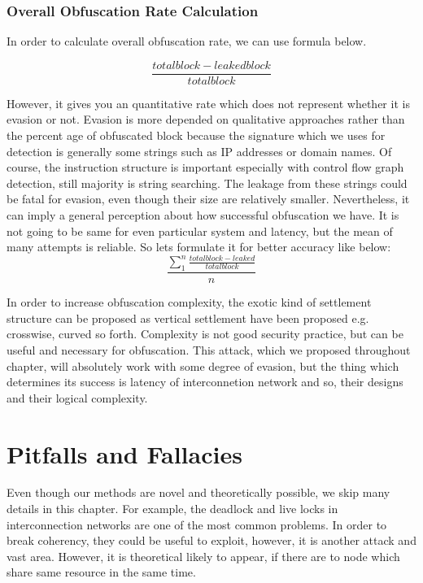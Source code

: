 \subsubsection{Overall Obfuscation Rate Calculation}
In order to calculate overall obfuscation rate, we can use formula below. 

\begin{equation}
	\frac{totalblock-leakedblock}{totalblock}
\end{equation}

However, it gives you an quantitative rate which does not represent whether it is evasion or not. Evasion is more depended on qualitative approaches rather than the percent age of obfuscated block because the signature which we uses for detection is generally some strings such as IP addresses or domain names. Of course, the instruction structure is important especially with control flow graph detection, still majority is string searching. The leakage from these strings could be fatal for evasion, even though their size are relatively smaller. Nevertheless, it can imply a general perception about how successful obfuscation we have. It is not going to be same for even particular system and latency, but the mean of many attempts is reliable. So lets formulate it for better accuracy like below:
\begin{equation}
	\frac{\sum_{1}^{n}\frac{totalblock-leaked}{totalblock}}{n}
\end{equation}

In order to increase obfuscation complexity, the exotic kind of settlement structure can be proposed as vertical settlement have been proposed e.g. crosswise, curved so forth. Complexity is not good security practice, but can be useful and necessary for obfuscation. This attack, which we proposed  throughout chapter, will absolutely work with some degree of evasion, but the thing which determines its success is latency of interconnetion network and so, their designs and their logical complexity.
\section{Pitfalls and Fallacies}
Even though our methods are novel and theoretically possible, we skip many details in this chapter. For example, the deadlock and live locks in interconnection networks are one of the most common problems. In order to break coherency, they could be useful to exploit, however, it is another attack and vast area. However, it is theoretical likely to appear, if there are to node which share same resource in the same time. 

